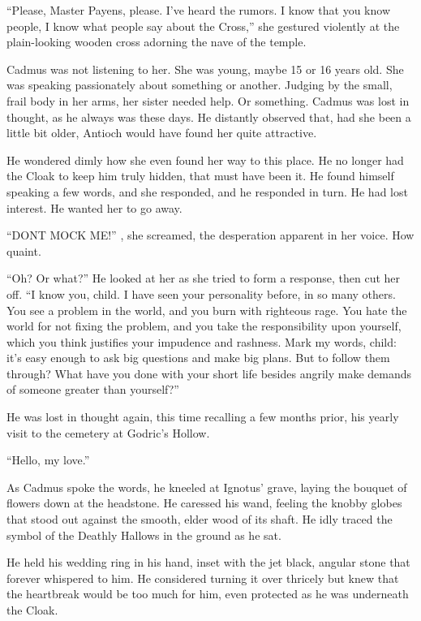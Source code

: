 \simpleline
{}
“Please, Master Payens, please. I’ve heard the rumors. I know that you know people, I know what people say about the Cross,” she gestured violently at the plain-looking wooden cross adorning the nave of the temple.

Cadmus was not listening to her. She was young, maybe 15 or 16 years old. She was speaking passionately about something or another. Judging by the small, frail body in her arms, her sister needed help. Or something. Cadmus was lost in thought, as he always was these days. He distantly observed that, had she been a little bit older, Antioch would have found her quite attractive.

He wondered dimly how she even found her way to this place. He no longer had the Cloak to keep him truly hidden, that must have been it. He found himself speaking a few words, and she responded, and he responded in turn. He had lost interest. He wanted her to go away.

“DONT MOCK ME!” , she screamed, the desperation apparent in her voice. How quaint.

“Oh? Or what?” He looked at her as she tried to form a response, then cut her off. “I know you, child. I have seen your personality before, in so many others. You see a problem in the world, and you burn with righteous rage. You hate the world for not fixing the problem, and you take the responsibility upon yourself, which you think justifies your impudence and rashness. Mark my words, child: it’s easy enough to ask big questions and make big plans. But to follow them through? What have you done with your short life besides angrily make demands of someone greater than yourself?”

He was lost in thought again, this time recalling a few months prior, his yearly visit to the cemetery at Godric’s Hollow.

“Hello, my love.”

As Cadmus spoke the words, he kneeled at Ignotus’ grave, laying the bouquet of flowers down at the headstone. He caressed his wand, feeling the knobby globes that stood out against the smooth, elder wood of its shaft. He idly traced the symbol of the Deathly Hallows in the ground as he sat.

He held his wedding ring in his hand, inset with the jet black, angular stone that forever whispered to him. He considered turning it over thricely but knew that the heartbreak would be too much for him, even protected as he was underneath the Cloak.

